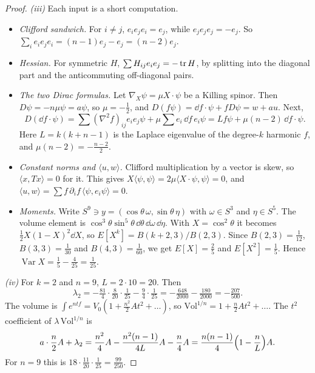 \begin{proof}
\emph{(iii)} Each input is a short computation.
\begin{itemize}
\item \emph{Clifford sandwich.} For $i\ne j$, $e_ie_je_i=e_j$, while $e_je_je_j=-e_j$. So $\sum_ie_ie_je_i=(n-1)e_j-e_j=(n-2)e_j$.
\item \emph{Hessian.} For symmetric $H$, $\sum H_{ij}e_ie_j=-\operatorname{tr} H$, by splitting into the diagonal part and the anticommuting off-diagonal pairs.
\item \emph{The two Dirac formulas.} Let $\nabla_X\psi=\mu X\cdot\psi$ be a Killing spinor. Then $D\psi=-n\mu\psi=a\psi$, so $\mu=-\frac12$, and $D(f\psi)=\dd f\cdot\psi+fD\psi=w+au$. Next,
\[
D(\dd f\cdot\psi)=\sum(\nabla^2f)_{ij}e_ie_j\psi+\mu\sum e_i\,\dd f\,e_i\psi=Lf\psi+\mu(n-2)\,\dd f\cdot\psi .
\]
Here $L=k(k+n-1)$ is the Laplace eigenvalue of the degree-$k$ harmonic $f$, and $\mu(n-2)=-\frac{n-2}2$.
\item \emph{Constant norms and $\langle u,w\rangle$.} Clifford multiplication by a vector is skew, so $\langle x,Tx\rangle=0$ for it. This gives $X\langle\psi,\psi\rangle=2\mu\langle X\cdot\psi,\psi\rangle=0$, and $\langle u,w\rangle=\sum f\,\partial_if\,\langle\psi,e_i\psi\rangle=0$.
\item \emph{Moments.} Write $S^9\ni y=(\cos\theta\,\omega,\sin\theta\,\eta)$ with $\omega\in S^3$ and $\eta\in S^5$. The volume element is $\cos^3\theta\sin^5\theta\,\dd\theta\,\dd\omega\,\dd\eta$. With $X=\cos^2\theta$ it becomes $\frac12X(1-X)^2\dd X$, so $E[X^k]=B(k+2,3)/B(2,3)$. Since $B(2,3)=\frac1{12}$, $B(3,3)=\frac1{30}$ and $B(4,3)=\frac1{60}$, we get $E[X]=\frac25$ and $E[X^2]=\frac15$. Hence $\operatorname{Var}X=\frac15-\frac4{25}=\frac1{25}$.
\end{itemize}

\emph{(iv)} For $k=2$ and $n=9$, $L=2\cdot10=20$. Then
\[
\lambda_2=-\tfrac{81}4\cdot\tfrac8{20}\cdot\tfrac1{25}-\tfrac94\cdot\tfrac1{25}=-\tfrac{648}{2000}-\tfrac{180}{2000}=-\tfrac{207}{500}.
\]
The volume is $\int e^{ntf}=V_0(1+\frac{n^2}2At^2+\dots)$, so $\mathrm{Vol}^{1/n}=1+\frac n2At^2+\dots$. The $t^2$ coefficient of $\lambda\,\mathrm{Vol}^{1/n}$ is
\[
a\cdot\frac n2A+\lambda_2=\frac{n^2}4A-\frac{n^2(n-1)}{4L}A-\frac n4A=\frac{n(n-1)}4\Bigl(1-\frac nL\Bigr)A .
\]
For $n=9$ this is $18\cdot\frac{11}{20}\cdot\frac1{25}=\frac{99}{250}$.


\end{proof}
